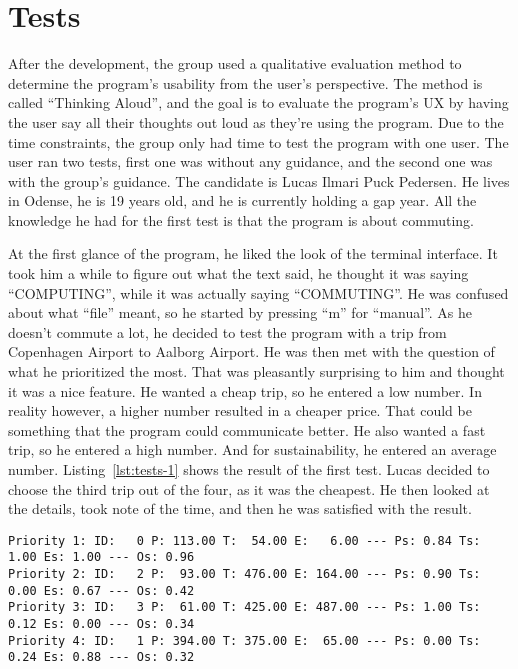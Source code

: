 \section{Tests}\label{sec:tests}

After the development, the group used a qualitative evaluation method to determine the program's usability from the
user's perspective.
The method is called ``Thinking Aloud'', and the goal is to evaluate the program's UX by having the user say all their
thoughts out loud as they're using the program.
Due to the time constraints, the group only had time to test the program with one user.
The user ran two tests, first one was without any guidance, and the second one was with the group's guidance.
The candidate is Lucas Ilmari Puck Pedersen.
He lives in Odense, he is 19 years old, and he is currently holding a gap year.
All the knowledge he had for the first test is that the program is about commuting.

At the first glance of the program, he liked the look of the terminal interface.
It took him a while to figure out what the text said, he thought it was saying ``COMPUTING'', while it was actually
saying ``COMMUTING''.
He was confused about what ``file'' meant, so he started by pressing ``m'' for ``manual''.
As he doesn't commute a lot, he decided to test the program with a trip from Copenhagen Airport to Aalborg Airport.
He was then met with the question of what he prioritized the most.
That was pleasantly surprising to him and thought it was a nice feature.
He wanted a cheap trip, so he entered a low number.
In reality however, a higher number resulted in a cheaper price.
That could be something that the program could communicate better.
He also wanted a fast trip, so he entered a high number.
And for sustainability, he entered an average number.
Listing~\ref{lst:tests-1} shows the result of the first test.
Lucas decided to choose the third trip out of the four, as it was the cheapest.
He then looked at the details, took note of the time, and then he was satisfied with the result.

\begin{lstlisting}[label={lst:tests-1}, caption={Copenhagen Airport to Aalborg Airport.}, captionpos=b, language={}]
Priority 1: ID:   0 P: 113.00 T:  54.00 E:   6.00 --- Ps: 0.84 Ts: 1.00 Es: 1.00 --- Os: 0.96
Priority 2: ID:   2 P:  93.00 T: 476.00 E: 164.00 --- Ps: 0.90 Ts: 0.00 Es: 0.67 --- Os: 0.42
Priority 3: ID:   3 P:  61.00 T: 425.00 E: 487.00 --- Ps: 1.00 Ts: 0.12 Es: 0.00 --- Os: 0.34
Priority 4: ID:   1 P: 394.00 T: 375.00 E:  65.00 --- Ps: 0.00 Ts: 0.24 Es: 0.88 --- Os: 0.32
\end{lstlisting}

